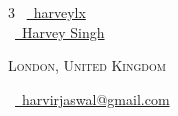 \documentclass[a4paper,10pt]{extarticle} %
\begin{document}
\pagestyle{empty} %


\begin{multicols}{3}
\normalsize \faGithub\ {\href{https://github.com/harveylx}{\ harveylx}}\\
\normalsize \faLinkedinSquare\ {\href{https://www.linkedin.com/in/harveysingh1}{\  Harvey Singh}}\\

\columnbreak

\par{\par} %
\par{\centering\normalsize {\textsc{London, United Kingdom}}\hfill\par}
\columnbreak
\raggedright\hfill\normalsize \faEnvelope\ {\href{mailto:harvirjaswal@gmail.com}{\  harvirjaswal@gmail.com}}\\
\end{multicols}

\end{document}
